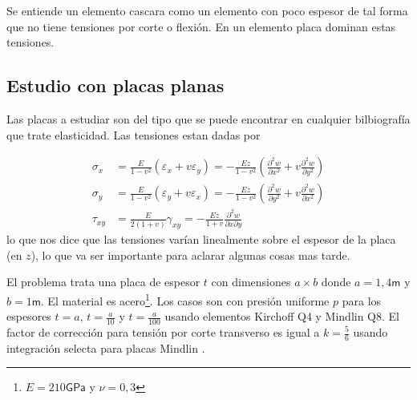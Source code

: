 \documentclass[onecolumn,10pt,titlepage]{article}
\newcommand{\unit}[1]{\textsf{#1}}
\newcommand{\giga}{\unit{G}}
\newcommand{\meter}{\unit{m}}
\newcommand{\pascal}{\unit{Pa}}
\newcommand{\si}[1]{#1}
\newcommand{\SI}[2]{#1\si{#2}}
\begin{document}
Se entiende un elemento cascara como un elemento con poco espesor de tal forma que no tiene tensiones por corte o flexión. En un elemento placa dominan estas tensiones. 


\subsection{Estudio con placas planas}
Las placas a estudiar son del tipo que se puede encontrar en cualquier bilbiografía que trate elasticidad\cite{ugural2003advanced}. Las tensiones estan dadas por 

\begin{align} \sigma_{x} &=\frac{E}{1-v^{2}}\left(\varepsilon_{x}+v \varepsilon_{y}\right)=-\frac{E z}{1-v^{2}}\left(\frac{\partial^{2} w}{\partial x^{2}}+v \frac{\partial^{2} w}{\partial y^{2}}\right) \\ \sigma_{y} &=\frac{E}{1-v^{2}}\left(\varepsilon_{y}+v \varepsilon_{x}\right)=-\frac{E z}{1-v^{2}}\left(\frac{\partial^{2} w}{\partial y^{2}}+v \frac{\partial^{2} w}{\partial x^{2}}\right) \\ \tau_{x y} &=\frac{E}{2(1+v)} \gamma_{x y}=-\frac{E z}{1+v} \frac{\partial^{2} w}{\partial x \partial y} 
\end{align}
lo que nos dice que las tensiones varían linealmente sobre el espesor de la placa (en $z$), lo que va ser importante para aclarar algunas cosas mas tarde.


El problema trata una placa de espesor $t$ con dimensiones $a\times b$ donde $a=1,4\si{\meter}$ y $b=1\si{\meter}$. El material es acero\footnote{$E=\SI{210}{\giga \pascal}$ y $\nu=0,3$}. Los casos son con presión uniforme $p$ para los espesores $t=a$, $t=\frac{a}{10}$ y $t=\frac{a}{100}$ usando elementos Kirchoff Q4 y Mindlin Q8. El factor de corrección para tensión por corte transverso es igual a $k=\frac{5}{6}$ usando integración selecta\citep{cook2007concepts} para placas Mindlin . 
\end{document}
